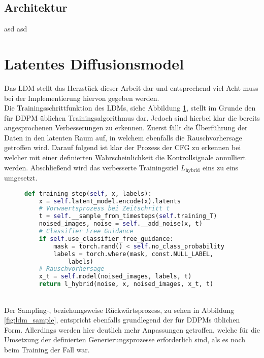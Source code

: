 \subsection{Architektur}

asd
asd

\section {Latentes Diffusionsmodel}

Das \ac{LDM} stellt das Herzstück dieser Arbeit dar und entsprechend viel Acht muss bei der Implementierung hiervon gegeben werden.\\ 
Die Trainingsschrittfunktion des \ac{LDM}s, siehe Abbildung \ref{fig:ldm_training}, stellt im Grunde den für \ac{DDPM} üblichen Trainingsalgorithmus dar. Jedoch sind hierbei klar die bereits angesprochenen Verbesserungen zu erkennen. Zuerst fällt die Überführung der Daten in den latenten Raum auf, in welchem ebenfalls die Rauschvorhersage getroffen wird. Darauf folgend ist klar der Prozess der \ac{CFG} zu erkennen bei welcher mit einer definierten Wahrscheinlichkeit die Kontrollsignale annulliert werden. Abschließend wird das verbesserte Trainingsziel $L_\text{hybrid}$ eins zu eins umgesetzt.
\begin{figure}[htbp]
\begin{lstlisting}[language=python]
def training_step(self, x, labels):
    x = self.latent_model.encode(x).latents
    # Vorwaertsprozess bei Zeitschritt t
    t = self.__sample_from_timesteps(self.training_T)
    noised_images, noise = self.__add_noise(x, t)
    # Classifier Free Guidance
    if self.use_classifier_free_guidance: 
        mask = torch.rand() < self.no_class_probability
        labels = torch.where(mask, const.NULL_LABEL, 
            labels)   
    # Rauschvorhersage
    x_t = self.model(noised_images, labels, t)
    return l_hybrid(noise, x, noised_images, x_t, t)
\end{lstlisting}
    \captionsetup{type=figure}
    \label{fig:ldm_training}
\end{figure} \\
Der Sampling-, beziehungsweise Rückwärtsprozess, zu sehen in Abbildung \ref{fig:ldm_sample}, entspricht ebenfalls grundlegend der für \ac{DDPM}s üblichen Form. Allerdings werden hier deutlich mehr Anpassungen getroffen, welche für die Umsetzung der definierten Generierungsprozesse erforderlich sind, als es noch beim Training der Fall war. \\
